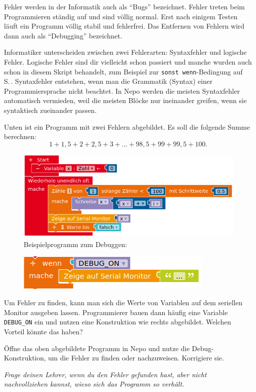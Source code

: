 Fehler werden in der Informatik auch als \enquote{Bugs} bezeichnet. Fehler treten beim Programmieren ständig auf und sind völlig normal. Erst nach einigem Testen läuft ein Programm völlig stabil und fehlerfrei. Das Entfernen von Fehlern wird dann auch als \enquote{Debugging} bezeichnet. 

Informatiker unterscheiden zwischen zwei Fehlerarten: Syntaxfehler und logische Fehler. Logische Fehler sind dir vielleicht schon passiert und manche wurden auch schon in diesem Skript behandelt, zum Beispiel zur \texttt{sonst wenn}-Bedingung auf S.\,\pageref{abb:sonstWenn1}. Syntaxfehler entstehen, wenn man die Grammatik (Syntax) einer Programmiersprache nicht beachtet. In Nepo werden die meisten Syntaxfehler automatisch vermieden, weil die meisten Blöcke nur ineinander greifen, wenn sie syntaktisch zueinander passen.

Unten ist ein Programm mit zwei Fehlern abgebildet. Es soll die folgende Summe berechnen:
\begin{equation*}
	1 + 1,5 + 2 + 2,5 + 3 + \dots + 98,5 + 99 + 99,5 + 100.
\end{equation*}

\begin{figure}[H]
	\centering
	\includegraphics[width=0.7\linewidth]{./pics/debugBsp.png}
	\caption{Beispielprogramm zum Debuggen: }
\end{figure}

\begin{aufgabe}
	
	\begin{figure}
		\centering
		\includegraphics[width=\linewidth]{./pics/DEBUGON.png}
	\end{figure}
	Um Fehler zu finden, kann man sich die Werte von Variablen auf dem seriellen Monitor ausgeben lassen. Programmierer bauen dann häufig eine Variable \texttt{DEBUG\_ON} ein und nutzen eine Konstruktion wie rechts abgebildet. Welchen Vorteil könnte das haben?
	
	Öffne das oben abgebildete Programm in Nepo und nutze die Debug-Konstruktion, um die Fehler zu finden oder nachzuweisen. Korrigiere sie.
	
	\emph{Frage deinen Lehrer, wenn du den Fehler gefunden hast, aber nicht nachvollziehen kannst, wieso sich das Programm so verhält.}
\end{aufgabe}

